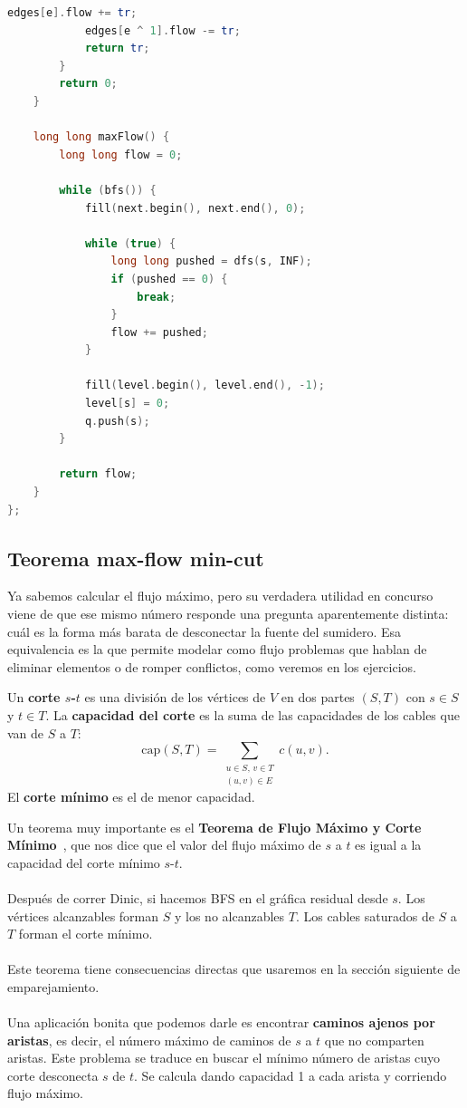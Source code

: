 \begin{lstlisting}[language=C++]
            edges[e].flow += tr;
            edges[e ^ 1].flow -= tr;
            return tr;
        }
        return 0;
    }

    long long maxFlow() {
        long long flow = 0;

        while (bfs()) {
            fill(next.begin(), next.end(), 0);

            while (true) {
                long long pushed = dfs(s, INF);
                if (pushed == 0) {
                    break;
                }
                flow += pushed;
            }

            fill(level.begin(), level.end(), -1);
            level[s] = 0;
            q.push(s);
        }

        return flow;
    }
};
\end{lstlisting}
\subsection{Teorema max-flow min-cut}

Ya sabemos calcular el flujo máximo, pero su verdadera utilidad en concurso viene de que ese mismo número responde una pregunta aparentemente distinta: cuál es la forma más barata de desconectar la fuente del sumidero. Esa equivalencia es la que permite modelar como flujo problemas que hablan de eliminar elementos o de romper conflictos, como veremos en los ejercicios.

\begin{definition} Un \textbf{corte $s$-$t$} es una división de los vértices de $V$ en dos partes $(S, T)$ con $s \in S$ y $t \in T$. La \textbf{capacidad del corte} es la suma de las capacidades de los cables que van de $S$ a $T$:
\[
\text{cap}(S,T) = \sum_{\substack{u \in S,\, v \in T \\ (u,v)\in E}} c(u,v).
\]
El \textbf{corte mínimo} es el de menor capacidad.
\end{definition}
Un teorema muy importante es el \textbf{Teorema de Flujo Máximo y Corte Mínimo}~\cite{toronto_mfmc}, que nos dice que el valor del flujo máximo de $s$ a $t$ es igual a la capacidad del corte mínimo $s$-$t$.
\\\\
Después de correr Dinic, si hacemos BFS en el gráfica residual desde $s$.
Los vértices alcanzables forman $S$ y los no alcanzables $T$. Los cables
saturados de $S$ a $T$ forman el corte mínimo.
\\\\
Este teorema tiene consecuencias directas que usaremos en la sección siguiente de emparejamiento.
\\\\
Una aplicación bonita que podemos darle es encontrar \textbf{caminos ajenos por aristas}, es decir, el número máximo de caminos de $s$ a
$t$ que no comparten aristas. Este problema se traduce en buscar el mínimo número de aristas cuyo corte desconecta $s$ de $t$. Se calcula dando capacidad 1 a cada arista y corriendo flujo máximo.
 
